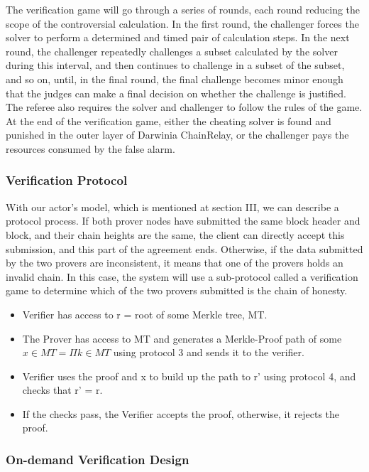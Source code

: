 The verification game will go through a series of rounds, each round reducing the scope of the controversial calculation. In the first round, the challenger forces the solver to perform a determined and timed pair of calculation steps. In the next round, the challenger repeatedly challenges a subset calculated by the solver during this interval, and then continues to challenge in a subset of the subset, and so on, until, in the final round, the final challenge becomes minor enough that the judges can make a final decision on whether the challenge is justified. The referee also requires the solver and challenger to follow the rules of the game. At the end of the verification game, either the cheating solver is found and punished in the outer layer of Darwinia ChainRelay, or the challenger pays the resources consumed by the false alarm.

\subsubsection*{Verification Protocol} 

With our actor’s model, which is mentioned at section III, we can describe a protocol process. If both prover nodes have submitted the same block header and block, and their chain heights are the same, the client can directly accept this submission, and this part of the agreement ends. Otherwise, if the data submitted by the two provers are inconsistent, it means that one of the provers holds an invalid chain. In this case, the system will use a sub-protocol called a verification game to determine which of the two provers submitted is the chain of honesty. 

\begin{itemize}
    \item Verifier has access to r = root of some Merkle tree, MT.
    \item The Prover has access to MT and generates a Merkle-Proof path of some $x \in MT = \Pi k \in MT$ using protocol 3 and sends it to the verifier.
    \item Verifier uses the proof and x to build up the path to r' using protocol 4, and checks that r' = r.
    \item If the checks pass, the Verifier accepts the proof, otherwise, it rejects the proof.
\end{itemize}

\subsubsection*{On-demand Verification Design}

